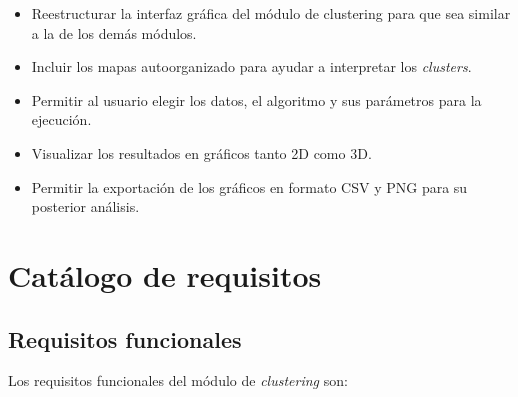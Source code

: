 \begin{itemize}
    \item Reestructurar la interfaz gráfica del módulo de clustering para que sea similar a la de los demás módulos.
    \item Incluir los mapas autoorganizado para ayudar a interpretar los \emph{clusters}.
    \item Permitir al usuario elegir los datos, el algoritmo y sus parámetros para la ejecución.
    \item Visualizar los resultados en gráficos tanto 2D como 3D.
    \item Permitir la exportación de los gráficos en formato CSV y PNG para su posterior análisis. 
\end{itemize}

\section{Catálogo de requisitos}

\subsection{Requisitos funcionales}

Los requisitos funcionales del módulo de \emph{clustering} son:

